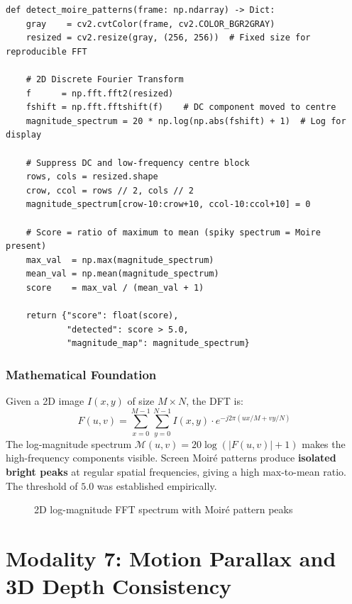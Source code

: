\documentclass[12pt,a4paper]{report}
\begin{document}
\begin{lstlisting}[style=pythonstyle, caption={2D FFT Moire Detection --- Moire\_Detection\_Modality.py}]
def detect_moire_patterns(frame: np.ndarray) -> Dict:
    gray    = cv2.cvtColor(frame, cv2.COLOR_BGR2GRAY)
    resized = cv2.resize(gray, (256, 256))  # Fixed size for reproducible FFT

    # 2D Discrete Fourier Transform
    f      = np.fft.fft2(resized)
    fshift = np.fft.fftshift(f)    # DC component moved to centre
    magnitude_spectrum = 20 * np.log(np.abs(fshift) + 1)  # Log for display

    # Suppress DC and low-frequency centre block
    rows, cols = resized.shape
    crow, ccol = rows // 2, cols // 2
    magnitude_spectrum[crow-10:crow+10, ccol-10:ccol+10] = 0

    # Score = ratio of maximum to mean (spiky spectrum = Moire present)
    max_val  = np.max(magnitude_spectrum)
    mean_val = np.mean(magnitude_spectrum)
    score    = max_val / (mean_val + 1)

    return {"score": float(score),
            "detected": score > 5.0,
            "magnitude_map": magnitude_spectrum}
\end{lstlisting}

\subsection{Mathematical Foundation}
Given a 2D image $I(x,y)$ of size $M \times N$, the DFT is:
\[
F(u,v) = \sum_{x=0}^{M-1}\sum_{y=0}^{N-1} I(x,y) \cdot e^{-j2\pi(ux/M + vy/N)}
\]
The log-magnitude spectrum $\mathcal{M}(u,v) = 20 \log(|F(u,v)| + 1)$ makes the high-frequency components visible. Screen Moir\'{e} patterns produce \textbf{isolated bright peaks} at regular spatial frequencies, giving a high max-to-mean ratio. The threshold of $5.0$ was established empirically.

\begin{figure}[H]
    \centering
    \caption{2D log-magnitude FFT spectrum with Moir\'{e} pattern peaks}
    \label{fig:moire}
\end{figure}

\chapter{Modality 7: Motion Parallax and 3D Depth Consistency}
\end{document}
